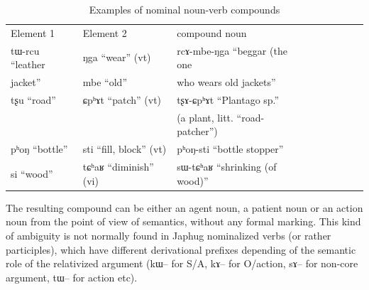 \documentclass[oldfontcommands,oneside,a4paper,11pt]{article}
\newcommand{\ipa}[1]{{\phon #1}} %
\begin{document}
% 

\begin{table}[H] \centering
\caption{Examples of nominal noun-verb compounds}\label{tab:noun.verb}
\begin{tabular}{lllllllll} \toprule
Element 1  & Element 2  & compound noun  \\
\ipa{tɯ-rcu} ``leather & \ipa{ŋga} ``wear'' (vt)& \ipa{rcɤ-mbe-ŋga}  ``beggar (the one  \\
 jacket''& \ipa{mbe} ``old''&who wears old jackets''\\
\ipa{tʂu} ``road'' & \ipa{ɕpʰɤt} ``patch'' (vt) & \ipa{tʂɤ-ɕpʰɤt} ``Plantago sp.''\\
&& (a plant, litt. ``road-patcher'')\\
\ipa{pʰoŋ} ``bottle'' & \ipa{sti} ``fill, block'' (vt) & \ipa{pʰoŋ-sti} ``bottle stopper'' \\
\ipa{si} ``wood'' & \ipa{tɕʰaʁ} ``diminish'' (vi) & \ipa{sɯ-tɕʰaʁ} ``shrinking (of wood)'' \\
 \bottomrule
\end{tabular}
\end{table}
The resulting compound can be either an agent noun, a patient noun or an action noun from the point of view of semantics, without any formal marking. This kind of ambiguity is not normally found in Japhug nominalized verbs (or rather participles), which have different derivational prefixes depending of the semantic role of the relativized argument (\ipa{kɯ}-- for S/A, \ipa{kɤ}-- for O/action, \ipa{sɤ}-- for non-core argument, \ipa{tɯ}-- for action etc).
\end{document}
